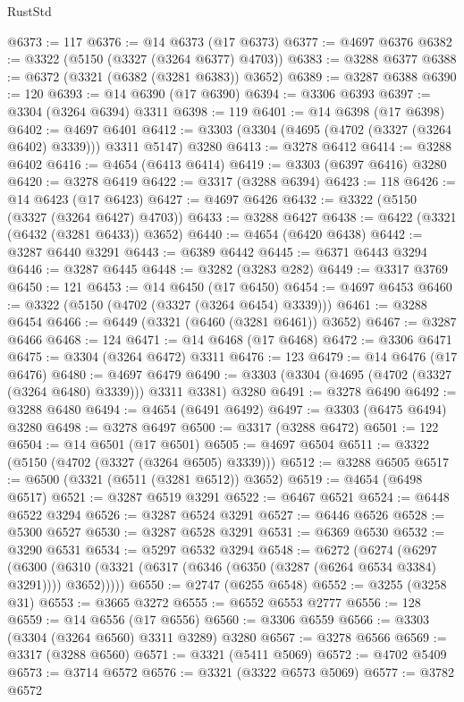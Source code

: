 \begin{lexlean}{RustStd}
\begin{coremodule}
@6373 := 117
@6376 := @14 @6373 (@17 @6373)
@6377 := @4697 @6376
@6382 := @3322 (@5150 (@3327 (@3264 @6377) @4703))
@6383 := @3288 @6377
@6388 := @6372 (@3321 (@6382 (@3281 @6383)) @3652)
@6389 := @3287 @6388
@6390 := 120
@6393 := @14 @6390 (@17 @6390)
@6394 := @3306 @6393
@6397 := @3304 (@3264 @6394) @3311
@6398 := 119
@6401 := @14 @6398 (@17 @6398)
@6402 := @4697 @6401
@6412 := @3303 (@3304 (@4695 (@4702 (@3327 (@3264 @6402) @3339))) @3311 @5147) @3280
@6413 := @3278 @6412
@6414 := @3288 @6402
@6416 := @4654 (@6413 @6414)
@6419 := @3303 (@6397 @6416) @3280
@6420 := @3278 @6419
@6422 := @3317 (@3288 @6394)
@6423 := 118
@6426 := @14 @6423 (@17 @6423)
@6427 := @4697 @6426
@6432 := @3322 (@5150 (@3327 (@3264 @6427) @4703))
@6433 := @3288 @6427
@6438 := @6422 (@3321 (@6432 (@3281 @6433)) @3652)
@6440 := @4654 (@6420 @6438)
@6442 := @3287 @6440 @3291
@6443 := @6389 @6442
@6445 := @6371 @6443 @3294
@6446 := @3287 @6445
@6448 := @3282 (@3283 @282)
@6449 := @3317 @3769
@6450 := 121
@6453 := @14 @6450 (@17 @6450)
@6454 := @4697 @6453
@6460 := @3322 (@5150 (@4702 (@3327 (@3264 @6454) @3339)))
@6461 := @3288 @6454
@6466 := @6449 (@3321 (@6460 (@3281 @6461)) @3652)
@6467 := @3287 @6466
@6468 := 124
@6471 := @14 @6468 (@17 @6468)
@6472 := @3306 @6471
@6475 := @3304 (@3264 @6472) @3311
@6476 := 123
@6479 := @14 @6476 (@17 @6476)
@6480 := @4697 @6479
@6490 := @3303 (@3304 (@4695 (@4702 (@3327 (@3264 @6480) @3339))) @3311 @3381) @3280
@6491 := @3278 @6490
@6492 := @3288 @6480
@6494 := @4654 (@6491 @6492)
@6497 := @3303 (@6475 @6494) @3280
@6498 := @3278 @6497
@6500 := @3317 (@3288 @6472)
@6501 := 122
@6504 := @14 @6501 (@17 @6501)
@6505 := @4697 @6504
@6511 := @3322 (@5150 (@4702 (@3327 (@3264 @6505) @3339)))
@6512 := @3288 @6505
@6517 := @6500 (@3321 (@6511 (@3281 @6512)) @3652)
@6519 := @4654 (@6498 @6517)
@6521 := @3287 @6519 @3291
@6522 := @6467 @6521
@6524 := @6448 @6522 @3294
@6526 := @3287 @6524 @3291
@6527 := @6446 @6526
@6528 := @5300 @6527
@6530 := @3287 @6528 @3291
@6531 := @6369 @6530
@6532 := @3290 @6531
@6534 := @5297 @6532 @3294
@6548 := @6272
    (@6274
      (@6297
        (@6300 (@6310 (@3321 (@6317 (@6346 (@6350 (@3287 (@6264 @6534 @3384) @3291)))) @3652)))))
@6550 := @2747 (@6255 @6548)
@6552 := @3255 (@3258 @31)
@6553 := @3665 @3272
@6555 := @6552 @6553 @2777
@6556 := 128
@6559 := @14 @6556 (@17 @6556)
@6560 := @3306 @6559
@6566 := @3303 (@3304 (@3264 @6560) @3311 @3289) @3280
@6567 := @3278 @6566
@6569 := @3317 (@3288 @6560)
@6571 := @3321 (@5411 @5069)
@6572 := @4702 @5409
@6573 := @3714 @6572
@6576 := @3321 (@3322 @6573 @5069)
@6577 := @3782 @6572

\end{coremodule}
\end{lexlean}
